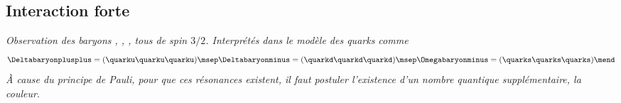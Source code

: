 \subsection{Interaction forte}\label{chapter-MS-MSSM-section-formalisme-subsec-QCD}
\emph{Observation des baryons \Deltabaryonplusplus, \Deltabaryonminus, \Omegabaryonminus, tous de spin $3/2$. Interprétés dans le modèle des quarks comme}
\begin{equation}
\Deltabaryonplusplus = (\quarku\quarku\quarku)
\msep
\Deltabaryonminus = (\quarkd\quarkd\quarkd)
\msep
\Omegabaryonminus = (\quarks\quarks\quarks)
\mend
\end{equation}
\emph{À cause du principe de Pauli, pour que ces résonances existent, il faut postuler l'existence d'un nombre quantique supplémentaire, la couleur.}
